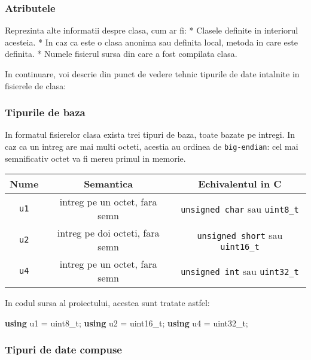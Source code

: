 \documentclass[]{article}
\newenvironment{Shaded}{}{}
\newcommand{\KeywordTok}[1]{\textcolor[rgb]{0.00,0.44,0.13}{\textbf{#1}}}
\newcommand{\DataTypeTok}[1]{\textcolor[rgb]{0.56,0.13,0.00}{#1}}
\newcommand{\NormalTok}[1]{#1}
\begin{document}
\subsubsection{Atributele}\label{atributele}

Reprezinta alte informatii despre clasa, cum ar fi: * Clasele definite
in interiorul acesteia. * In caz ca este o clasa anonima sau definita
local, metoda in care este definita. * Numele fisierul sursa din care a
fost compilata clasa.

In continuare, voi descrie din punct de vedere tehnic tipurile de date
intalnite in fisierele de clasa:

\subsubsection{Tipurile de baza}\label{tipurile-de-baza}

In formatul fisierelor clasa exista trei tipuri de baza, toate bazate pe
intregi. In caz ca un intreg are mai multi octeti, acestia au ordinea de
\texttt{big-endian}: cel mai semnificativ octet va fi mereu primul in
memorie.

\begin{longtable}[]{@{}ccc@{}}
	\toprule
	Nume        & Semantica                       & Echivalentul in C\tabularnewline
	\midrule
	\endhead
	\texttt{u1} & intreg pe un octet, fara semn   & \texttt{unsigned\ char}
	sau \texttt{uint8\_t}\tabularnewline
	\texttt{u2} & intreg pe doi octeti, fara semn & \texttt{unsigned\ short}
	sau \texttt{uint16\_t}\tabularnewline
	\texttt{u4} & intreg pe un octet, fara semn   & \texttt{unsigned\ int} sau
	\texttt{uint32\_t}\tabularnewline
	\bottomrule
\end{longtable}

In codul sursa al proiectului, acestea sunt tratate astfel:

\begin{Shaded}
	\begin{Highlighting}[]
		\KeywordTok{using}\NormalTok{ u1 = }\DataTypeTok{uint8_t}\NormalTok{;}
		\KeywordTok{using}\NormalTok{ u2 = }\DataTypeTok{uint16_t}\NormalTok{;}
		\KeywordTok{using}\NormalTok{ u4 = }\DataTypeTok{uint32_t}\NormalTok{;}
	\end{Highlighting}
\end{Shaded}

\subsubsection{Tipuri de date compuse}\label{tipuri-de-date-compuse}
\end{document}
